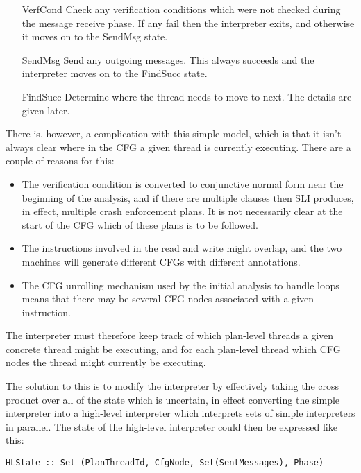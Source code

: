 \documentclass[12pt,a4paper]{book}
\begin{document}
\begin{itemize}
\item[VerfCond]
  Check any verification conditions which were not checked during the message receive phase.
  If any fail then the interpreter exits, and otherwise it moves on to the SendMsg state.
\item[SendMsg]
  Send any outgoing messages.
  This always succeeds and the interpreter moves on to the FindSucc state.
\item[FindSucc]
  Determine where the thread needs to move to next.
  The details are given later.
\end{itemize}

There is, however, a complication with this simple model, which is that it isn't always clear where in the CFG a given thread is currently executing.
There are a couple of reasons for this:

\begin{itemize}
\item
  The verification condition is converted to conjunctive normal form near the beginning of the analysis, and if there are multiple clauses then SLI produces, in effect, multiple crash enforcement plans.
  It is not necessarily clear at the start of the CFG which of these plans is to be followed.
\item
  The instructions involved in the read and write \StateMachines might overlap, and the two machines will generate different CFGs with different annotations.
\item
  The CFG unrolling mechanism used by the initial analysis to handle loops means that there may be several CFG nodes associated with a given instruction.
\end{itemize}

The interpreter must therefore keep track of which plan-level threads a given concrete thread might be executing, and for each plan-level thread which CFG nodes the thread might currently be executing.

The solution to this is to modify the interpreter by effectively taking the cross product over all of the state which is uncertain, in effect converting the simple interpreter into a high-level interpreter which interprets sets of simple interpreters in parallel.
The state of the high-level interpreter could then be expressed like this:

\begin{verbatim}
HLState :: Set (PlanThreadId, CfgNode, Set(SentMessages), Phase)
\end{verbatim}
\end{document}
